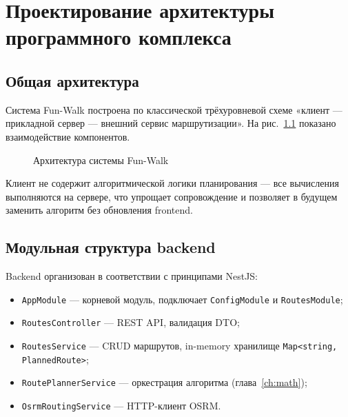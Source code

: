 \chapter{Проектирование архитектуры программного комплекса}
\label{ch:design}

\section{Общая архитектура}

Система Fun-Walk построена по классической трёхуровневой схеме «клиент ---
прикладной сервер --- внешний сервис маршрутизации». На рис.~\ref{fig:architecture}
показано взаимодействие компонентов.

\begin{figure}[H]
\centering
{}
\caption{Архитектура системы Fun-Walk}
\label{fig:architecture}
\end{figure}

Клиент не содержит алгоритмической логики планирования --- все вычисления
выполняются на сервере, что упрощает сопровождение и позволяет в будущем заменить
алгоритм без обновления frontend.

\section{Модульная структура backend}

Backend организован в соответствии с принципами NestJS:

\begin{itemize}
  \item \texttt{AppModule} --- корневой модуль, подключает \texttt{ConfigModule}
        и \texttt{RoutesModule};
  \item \texttt{RoutesController} --- REST API, валидация DTO;
  \item \texttt{RoutesService} --- CRUD маршрутов, in-memory хранилище
        \texttt{Map<string, PlannedRoute>};
  \item \texttt{RoutePlannerService} --- оркестрация алгоритма (глава~\ref{ch:math});
  \item \texttt{OsrmRoutingService} --- HTTP-клиент OSRM.
\end{itemize}

